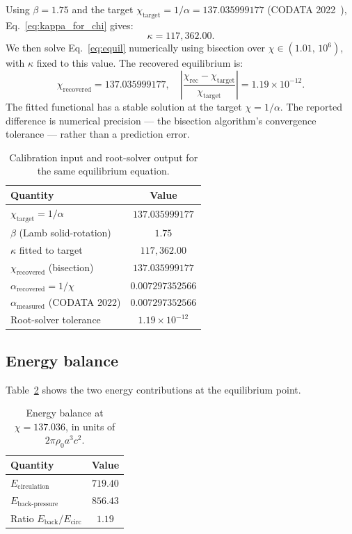 \documentclass[11pt]{article}
\begin{document}
Using $\beta = 1.75$ and the target $\chi_\text{target} = 1/\alpha = 137.035999177$
(CODATA 2022~\cite{CODATA2022}), Eq.~\eqref{eq:kappa_for_chi} gives:
\begin{equation*}
  \kappa = 117{,}362.00.
\end{equation*}
We then solve Eq.~\eqref{eq:equil} numerically using bisection over
$\chi \in (1.01,\, 10^6)$, with $\kappa$ fixed to this value. The recovered
equilibrium is:
\begin{equation*}
  \chi_\text{recovered} = 137.035999177,
  \quad
  \left|\frac{\chi_\text{rec} - \chi_\text{target}}{\chi_\text{target}}\right|
  = 1.19 \times 10^{-12}.
\end{equation*}
The fitted functional has a stable solution at the target $\chi=1/\alpha$. The
reported difference is numerical precision --- the bisection algorithm's
convergence tolerance --- rather than a prediction error.

\begin{table}[h]
  \caption{Calibration input and root-solver output for the same equilibrium equation.}
  \label{tab:stability}
  \begin{tabular}{lc}
    \toprule
    Quantity & Value \\
    \midrule
    $\chi_\text{target} = 1/\alpha$ & $137.035999177$ \\
    $\beta$ (Lamb solid-rotation) & $1.75$ \\
    $\kappa$ fitted to target & $117{,}362.00$ \\
    $\chi_\text{recovered}$ (bisection) & $137.035999177$ \\
    $\alpha_\text{recovered} = 1/\chi$ & $0.007297352566$ \\
    $\alpha_\text{measured}$ (CODATA 2022) & $0.007297352566$ \\
    Root-solver tolerance & $1.19\times10^{-12}$ \\
    \bottomrule
  \end{tabular}
\end{table}

\subsection{Energy balance}

Table~\ref{tab:energy} shows the two energy contributions at the equilibrium point.

\begin{table}[h]
  \caption{Energy balance at $\chi = 137.036$, in units of $2\pi\rho_0 a^3 c^2$.}
  \label{tab:energy}
  \begin{tabular}{lc}
    \toprule
    Quantity & Value \\
    \midrule
    $E_\text{circulation}$ & $719.40$ \\
    $E_\text{back-pressure}$ & $856.43$ \\
    Ratio $E_\text{back}/E_\text{circ}$ & $1.19$ \\
    \bottomrule
  \end{tabular}
\end{table}
\end{document}

